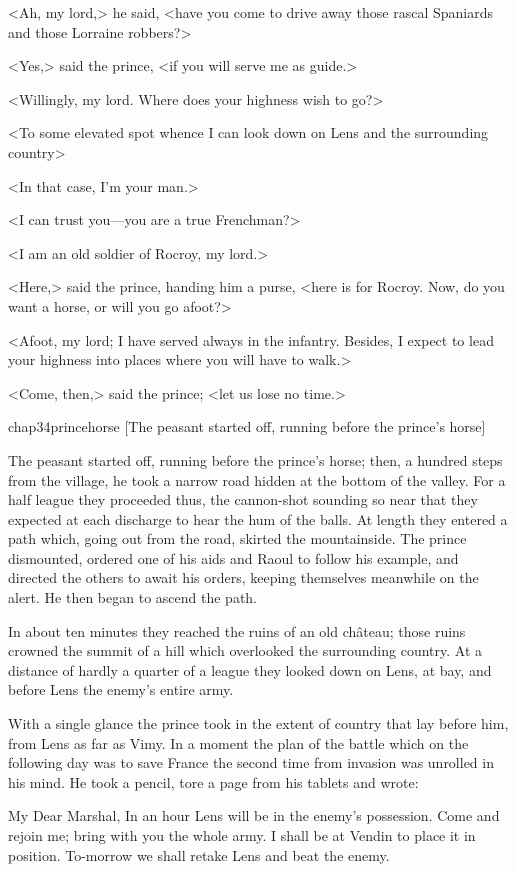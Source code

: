 <Ah, my lord,> he said, <have you come to drive away those rascal Spaniards and those Lorraine robbers?>

<Yes,> said the prince, <if you will serve me as guide.>

<Willingly, my lord. Where does your highness wish to go?>

<To some elevated spot whence I can look down on Lens and the surrounding country\longdash>

<In that case, I'm your man.>

<I can trust you—you are a true Frenchman?>

<I am an old soldier of Rocroy, my lord.>

<Here,> said the prince, handing him a purse, <here is for Rocroy. Now, do you want a horse, or will you go afoot?>

<Afoot, my lord; I have served always in the infantry. Besides, I expect to lead your highness into places where you will have to walk.>

<Come, then,> said the prince; <let us lose no time.>

\begin{bwbigpic}
	[\basicscale] 
	{chap34princehorse}
	[The peasant started off, running before the prince's horse]
\end{bwbigpic}

The peasant started off, running before the prince's horse; then, a hundred steps from the village, he took a narrow road hidden at the bottom of the valley. For a half league they proceeded thus, the cannon-shot sounding so near that they expected at each discharge to hear the hum of the balls. At length they entered a path which, going out from the road, skirted the mountainside. The prince dismounted, ordered one of his aids and Raoul to follow his example, and directed the others to await his orders, keeping themselves meanwhile on the alert. He then began to ascend the path.

In about ten minutes they reached the ruins of an old château; those ruins crowned the summit of a hill which overlooked the surrounding country. At a distance of hardly a quarter of a league they looked down on Lens, at bay, and before Lens the enemy's entire army.

With a single glance the prince took in the extent of country that lay before him, from Lens as far as Vimy. In a moment the plan of the battle which on the following day was to save France the second time from invasion was unrolled in his mind. He took a pencil, tore a page from his tablets and wrote:  
\begin{mail}{}{My Dear Marshal,}
	In an hour Lens will be in the enemy's possession. Come and rejoin me; bring with you the whole army. I shall be at Vendin to place it in position. To-morrow we shall retake Lens and beat the enemy.
	\end{mail}

